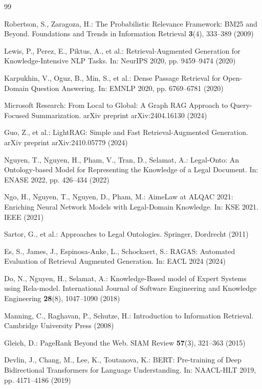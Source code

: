 \documentclass[11pt,a4paper]{article}
\begin{document}
\begin{thebibliography}{99}
\footnotesize
\setlength{\itemsep}{0pt}
\setlength{\parskip}{0pt}

Robertson, S., Zaragoza, H.: The Probabilistic Relevance Framework: BM25 and Beyond. Foundations and Trends in Information Retrieval \textbf{3}(4), 333--389 (2009)

Lewis, P., Perez, E., Piktus, A., et al.: Retrieval-Augmented Generation for Knowledge-Intensive NLP Tasks. In: NeurIPS 2020, pp. 9459--9474 (2020)

Karpukhin, V., Oguz, B., Min, S., et al.: Dense Passage Retrieval for Open-Domain Question Answering. In: EMNLP 2020, pp. 6769--6781 (2020)

Microsoft Research: From Local to Global: A Graph RAG Approach to Query-Focused Summarization. arXiv preprint arXiv:2404.16130 (2024)

Guo, Z., et al.: LightRAG: Simple and Fast Retrieval-Augmented Generation. arXiv preprint arXiv:2410.05779 (2024)

Nguyen, T., Nguyen, H., Pham, V., Tran, D., Selamat, A.: Legal-Onto: An Ontology-based Model for Representing the Knowledge of a Legal Document. In: ENASE 2022, pp. 426--434 (2022)

Ngo, H., Nguyen, T., Nguyen, D., Pham, M.: AimeLaw at ALQAC 2021: Enriching Neural Network Models with Legal-Domain Knowledge. In: KSE 2021. IEEE (2021)

Sartor, G., et al.: Approaches to Legal Ontologies. Springer, Dordrecht (2011)

Es, S., James, J., Espinosa-Anke, L., Schockaert, S.: RAGAS: Automated Evaluation of Retrieval Augmented Generation. In: EACL 2024 (2024)

Do, N., Nguyen, H., Selamat, A.: Knowledge-Based model of Expert Systems using Rela-model. International Journal of Software Engineering and Knowledge Engineering \textbf{28}(8), 1047--1090 (2018)

Manning, C., Raghavan, P., Schutze, H.: Introduction to Information Retrieval. Cambridge University Press (2008)

Gleich, D.: PageRank Beyond the Web. SIAM Review \textbf{57}(3), 321--363 (2015)

Devlin, J., Chang, M., Lee, K., Toutanova, K.: BERT: Pre-training of Deep Bidirectional Transformers for Language Understanding. In: NAACL-HLT 2019, pp. 4171--4186 (2019)


\end{thebibliography}
\end{document}
